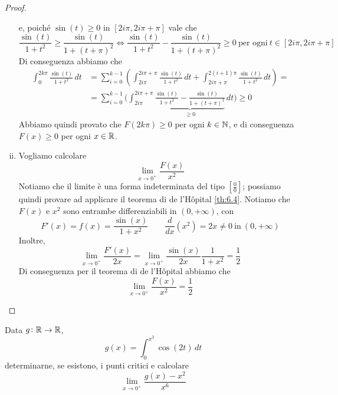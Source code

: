 \begin{proof}
\begin{enumerate}[(i)]
\[        \]
        e, poiché $\sin(t)\ge 0$ in $[2i\pi, 2i\pi+\pi]$ vale che 
        \[
        \frac{\sin(t)}{1+t^2}\ge \frac{\sin(t)}{1+(t+\pi)^2} \iff \frac{\sin(t)}{1+t^2}- \frac{\sin(t)}{1+(t+\pi)^2}\ge 0 \ \text{per ogni} \ t\in[2i\pi, 2i\pi + \pi]
        \]
        Di conseguenza abbiamo che
        \[
        \begin{split}
            \int_0^{2k\pi} \frac{\sin(t)}{1+t^2}\, dt & = \sum_{i=0}^{k-1} \left({\int_{2i\pi}^{2i\pi +\pi} \frac{\sin(t)}{1+t^2}\, dt} + {\int_{2i\pi + \pi }^{2(i+1)\pi} \frac{\sin(t)}{1+t^2}\, dt}\right) = \\
            & = \sum_{i=0}^{k-1} \bigg(\int_{2i\pi}^{2i\pi +\pi} \underbrace{\frac{\sin(t)}{1+t^2} - \frac{\sin(t)}{1+(t+\pi)^2}}_{\ge 0}\, dt\bigg)\ge 0
        \end{split}
        \]
        Abbiamo quindi provato che $F(2k\pi)\ge 0$ per ogni $k\in\amsbb{N}$, e di conseguenza $F(x)\ge 0$ per ogni $x\in\amsbb{R}$.
        \item Vogliamo calcolare 
        \[
        \lim_{x\to 0^+} \frac{F(x)}{x^2}
        \]
        Notiamo che il limite è una forma indeterminata del tipo $\left[\frac{0}{0}\right]$; possiamo quindi provare ad applicare il teorema di de l'H{\^o}pital \ref{th:6.4}. Notiamo che $F(x)$ e $x^2$ sono entrambe differenziabili in $(0,+\infty)$, con
        \[
        F'(x) = f(x) = \frac{\sin(x)}{1+x^2} \qquad \frac{d}{dx}(x^2) = 2x\ne 0 \ \text{in} \ (0,+\infty)
        \]
        Inoltre,
        \[
        \lim_{x\to 0^+} \frac{F'(x)}{2x} = \lim_{x\to 0^+} \frac{\sin(x)}{2x}\frac{1}{1+x^2} = \frac{1}{2}
        \]
        Di conseguenza per il teorema di de l'H{\^o}pital abbiamo che
        \[
        \lim_{x\to 0^+} \frac{F(x)}{x^2} = \frac{1}{2}
        \]
    \end{enumerate}
\end{proof}
\begin{exercise}
    \label{ex:9.2}
    Data $g\colon \amsbb{R}\to \amsbb{R}$,
    \[
    g(x) = \int_0^{x^2}\cos(2t)\, dt
    \]
    determinarne, se esistono, i punti critici e calcolare 
    \[
    \lim_{x\to 0^+} \frac{g(x)-x^2}{x^6}
    \]
\end{exercise}

